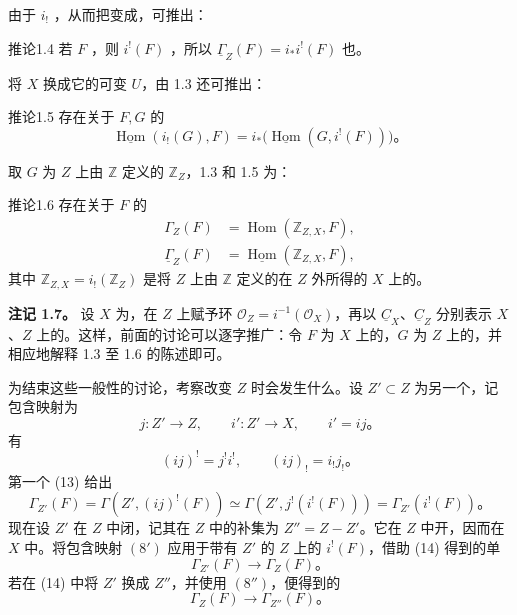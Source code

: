 由于 $i_!$ ，从而把变成，可推出：
\begin{SGAresult}{推论}{1.4}
若 $F$ ，则 $i^!(F)$ ，所以 $\underline{\Gamma}_Z(F)=i_*i^!(F)$ 也。
\end{SGAresult}
将 $X$ 换成它的可变 $U$，由 1.3 还可推出：
\begin{SGAresult}{推论}{1.5}
存在关于 $F,G$ 的
\[
\underline{\operatorname{Hom}}(i_!(G),F)
=i_*\bigl(\underline{\operatorname{Hom}}(G,i^!(F))\bigr)。\tag{11}
\]
\end{SGAresult}
取 $G$ 为 $Z$ 上由 $\mathbb Z$ 定义的 $\mathbb Z_Z$，1.3 和 1.5 为：
\begin{SGAresult}{推论}{1.6}
存在关于 $F$ 的
\[
\begin{aligned}
\Gamma_Z(F)&=\operatorname{Hom}(\mathbb Z_{Z,X},F),\\
\underline{\Gamma}_Z(F)&=\underline{\operatorname{Hom}}(\mathbb Z_{Z,X},F),
\end{aligned}\tag{12}
\]
其中 $\mathbb Z_{Z,X}=i_!(\mathbb Z_Z)$ 是将 $Z$ 上由 $\mathbb Z$ 定义的在 $Z$ 外所得的 $X$ 上的。
\end{SGAresult}
\textbf{注记 1.7。}
设 $X$ 为，在 $Z$ 上赋予环 $\mathcal O_Z=i^{-1}(\mathcal O_X)$，再以 $\underline C_X$、$\underline C_Z$ 分别表示 $X$、$Z$ 上的。这样，前面的讨论可以逐字推广：令 $F$ 为 $X$ 上的，$G$ 为 $Z$ 上的，并相应地解释 1.3 至 1.6 的陈述即可。

为结束这些一般性的讨论，考察改变 $Z$ 时会发生什么。设 $Z'\subset Z$ 为另一个，记包含映射为
\[
j:Z'\longrightarrow Z,\qquad i':Z'\longrightarrow X,\qquad i'=ij。
\]
有
\[
(ij)^!=j^!i^!,\qquad (ij)_!=i_!j_!。\tag{13}
\]
第一个 (13) 给出
\[
\Gamma_{Z'}(F)
=\Gamma(Z',(ij)^!(F))
\simeq\Gamma(Z',j^!(i^!(F)))
=\Gamma_{Z'}(i^!(F))。\tag{14}
\]
现在设 $Z'$ 在 $Z$ 中闭，记其在 $Z$ 中的补集为 $Z''=Z-Z'$。它在 $Z$ 中开，因而在 $X$ 中。将包含映射 $(8')$ 应用于带有 $Z'$ 的 $Z$ 上的 $i^!(F)$，借助 (14) 得到的单
\[
\Gamma_{Z'}(F)\longrightarrow\Gamma_Z(F)。\tag{15}
\]
若在 (14) 中将 $Z'$ 换成 $Z''$，并使用 $(8'')$，便得到的
\[
\Gamma_Z(F)\longrightarrow\Gamma_{Z''}(F)。\tag{$15'$}
\]

